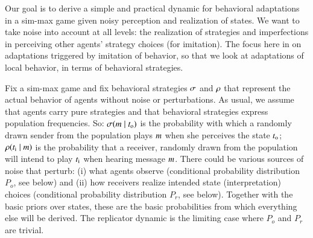 \documentclass[fleqn,reqno,11pt]{article}
\begin{document}
Our goal is to derive a simple and practical dynamic for behavioral adaptations in a sim-max
game given noisy perception and realization of states. We want to take noise into account at
all levels: the realization of strategies and imperfections in perceiving other agents'
strategy choices (for imitation). The focus here in on adaptations triggered by imitation of
behavior, so that we look at adaptations of local behavior, in terms of behavioral strategies.

Fix a sim-max game and fix behavioral strategies $\sigma$ and $\rho$ that represent the
actual behavior of agents without noise or perturbations. As usual, we assume that agents carry
pure strategies and that behavioral strategies express population frequencies. So:
$\sigma(m \mid t_{\mathrm{o}})$ is the probability with which a randomly drawn sender
from the population plays $m$ when she perceives the state $t_{\mathrm{o}}$;
$\rho(t_{\mathrm{i}} \mid m)$ is the probability that a receiver, randomly drawn from
the population will intend to play $t_{\mathrm{i}}$ when hearing message $m$. There could be
various sources of noise that perturb: (i) what agents observe (conditional probability
distribution $P_o$, see below) and (ii) how receivers realize intended state (interpretation)
choices (conditional probability distribution $P_r$, see below). Together with the basic priors
over states, these are the basic probabilities from which everything else will be derived. The
replicator dynamic is the limiting case where $P_o$ and $P_r$ are trivial.
\end{document}
